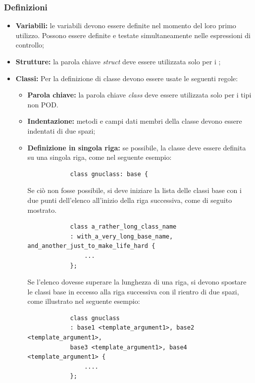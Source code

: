 \documentclass[../NomeDocumento.tex]{subfiles}
\begin{document}
	\subsubsection{Definizioni}
	\begin{itemize}
		\item \textbf{Variabili:} le variabili devono essere definite nel momento del loro primo utilizzo. Possono essere definite e testate simultaneamente nelle espressioni di controllo;
		
		\item \textbf{Strutture:} la parola chiave \textit{struct} deve essere utilizzata solo per i ;
		
		\item \textbf{Classi:} Per la definizione di classe devono essere usate le seguenti regole:
		
		\begin{itemize}
			\item \textbf{Parola chiave:} la parola chiave \textit{class} deve essere utilizzata solo per i tipi non POD.
			\item \textbf{Indentazione:} metodi e campi dati membri della classe devono essere indentati di due spazi;
			\item \textbf{Definizione in singola riga:} se possibile, la classe deve essere definita su una singola riga, come nel seguente esempio:
			
			\begin{verbatim}
			class gnuclass: base {
			\end{verbatim}
			
			Se ciò non fosse possibile, si deve iniziare la lista delle classi base con i due punti dell'elenco all'inizio della riga successiva, come di seguito mostrato.
			
			\begin{verbatim}
			class a_rather_long_class_name
			: with_a_very_long_base_name, and_another_just_to_make_life_hard {
				...
			};
			\end{verbatim}
			
			Se l'elenco dovesse superare la lunghezza di una riga, si devono spostare le classi base in eccesso alla riga successiva con il rientro di due spazi, come illustrato nel seguente esempio:
			
			\begin{verbatim}
			class gnuclass
			: base1 <template_argument1>, base2 <template_argument1>,
			base3 <template_argument1>, base4 <template_argument1> {
				....
			};
			\end{verbatim}
		

\end{itemize}
\end{itemize}
\end{document}
